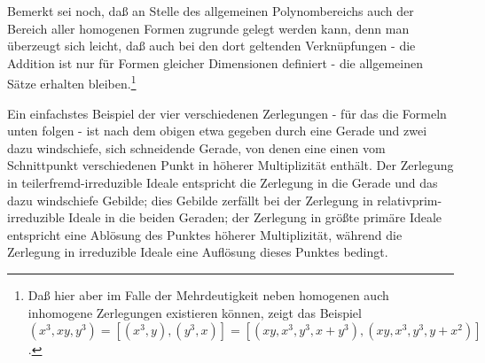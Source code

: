 \documentclass[11pt]{article}
\begin{document}
Bemerkt sei noch, daß an Stelle des allgemeinen Polynombereichs auch der Bereich aller homogenen Formen zugrunde gelegt werden kann, denn man überzeugt sich leicht, daß auch bei den dort geltenden Verknüpfungen - die Addition ist nur für Formen gleicher Dimensionen definiert - die allgemeinen Sätze erhalten bleiben.\footnote{Daß hier aber im Falle der Mehrdeutigkeit neben homogenen auch inhomogene Zerlegungen existieren können, zeigt das Beispiel $ (x^3,xy,y^3)=[(x^3,y),(y^3,x)]=[(xy,x^3,y^3,x+y^3),(xy,x^3,y^3,y+x^2)]$.}

Ein einfachstes Beispiel der vier verschiedenen Zerlegungen - für das die Formeln unten folgen - ist nach dem obigen etwa gegeben durch eine Gerade und zwei dazu windschiefe, sich schneidende Gerade, von denen eine einen vom Schnittpunkt verschiedenen Punkt in höherer Multiplizität enthält. Der Zerlegung in teilerfremd-irreduzible Ideale entspricht die Zerlegung in die Gerade und das dazu windschiefe Gebilde; dies Gebilde zerfällt bei der Zerlegung in relativprim-irreduzible Ideale in die beiden Geraden; der Zerlegung in größte primäre Ideale entspricht eine Ablösung des Punktes höherer Multiplizität, während die Zerlegung in irreduzible Ideale eine Auflösung dieses Punktes bedingt.
\end{document}
